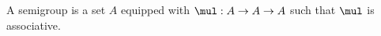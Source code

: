 \begin{theory}
   A semigroup is a set $A$
   equipped with $\mul : A\to A\to A$
   such that $\mul$ is associative.
\end{theory}
